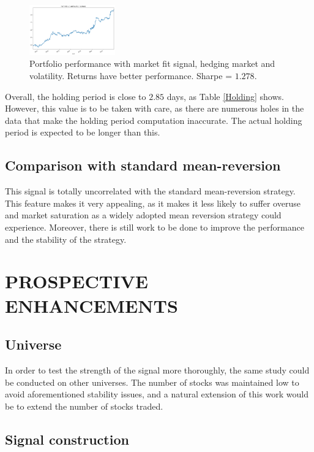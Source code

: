 \documentclass[letterpaper, 10 pt, conference]{ieeeconf}  %
\begin{document}
\begin{figure}[thpb]
\centering
\includegraphics[width=140px]{img/Fit_residuals_mkt_execute_vanilla.png}
\caption{Portfolio performance with market fit signal, hedging market and volatility. Returns have better performance. Sharpe = $1.278$.}
\label{best_performance}
\end{figure}

Overall, the holding period is close to $2.85$ days, as Table \ref{Holding} shows. However, this value is to be taken with care, as there are numerous holes in the data that make the holding period computation inaccurate. The actual holding period is expected to be longer than this. 

\subsection{Comparison with standard mean-reversion}

This signal is totally uncorrelated with the standard mean-reversion strategy. This feature makes it very appealing, as it makes it less likely to suffer overuse and market saturation as a widely adopted mean reversion strategy could experience. Moreover, there is still work to be done to improve the performance and the stability of the strategy.  

\section{PROSPECTIVE ENHANCEMENTS}

\subsection{Universe}
In order to test the strength of the signal more thoroughly, the same study could be conducted on other universes. The number of stocks was maintained low to avoid aforementioned stability issues, and a natural extension of this work would be to extend the number of stocks traded.

\subsection{Signal construction}
\end{document}
